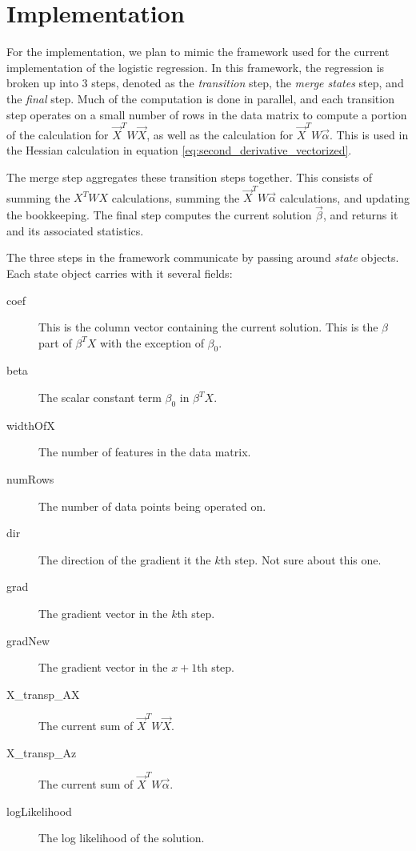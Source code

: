 \section{Implementation}\label{sec:implem}

For the implementation, we plan to mimic the framework used for the current
implementation of the logistic regression.  In this framework, the regression is
broken up into 3 steps, denoted as the  \textit{transition} step, the
\textit{merge states} step, and the \textit{final} step.  Much of the
computation is done in parallel, and each transition step operates on a small
number of rows in the data matrix to compute a portion of the calculation for
$\vec{X}^T W\vec{X}$, as well as the calculation for $\vec{X}^TW\vec{\alpha}$.
This is used in the Hessian calculation in equation
\ref{eq:second_derivative_vectorized}.

The merge step aggregates these transition steps together.  This consists of
summing the $X^T WX$ calculations, summing the $\vec{X}^TW\vec{\alpha}$
calculations, and updating the bookkeeping.   The final step computes the
current solution $\vec{\beta}$, and returns it and its associated statistics.

The three steps in the framework communicate by passing around \textit{state} objects.  Each state object carries with it several fields:
\begin{description}
\item [coef] This is the column vector containing the current solution.  This is the $\beta$ part of $\beta^TX$ with the exception of $\beta_0$.
\item [beta] The scalar constant term $\beta_0$ in $\beta^TX$.
\item [widthOfX] The number of features in the data matrix.
\item [numRows] The number of data points being operated on.
\item [dir] The direction of the gradient it the $k$th step.  Not sure about this one.
\item [grad] The gradient vector in the $k$th step.
\item [gradNew] The gradient vector in the $x+1$th step.
\item [X\_transp\_AX] The current sum of $\vec{X}^T W\vec{X}$.
\item [X\_transp\_Az] The current sum of $\vec{X}^TW\vec{\alpha}$.
\item [logLikelihood] The log likelihood  of the solution.
\end{description}


